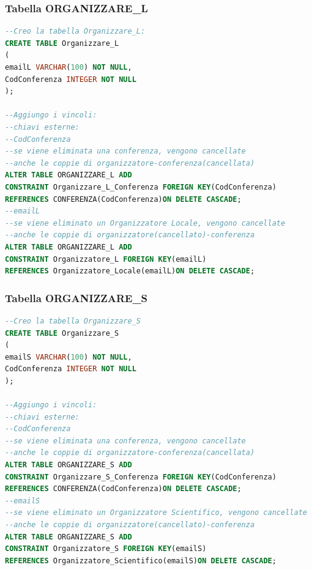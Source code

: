 \documentclass[a4page]{article}
\begin{document}
\subsubsection{Tabella ORGANIZZARE\_L}
\begin{lstlisting}[language=SQL,
        deletekeywords={IDENTITY,INT},
        morekeywords={clustered},    
        framesep=10pt,
        framextopmargin=10pt]
--Creo la tabella Organizzare_L: 
CREATE TABLE Organizzare_L
(
emailL VARCHAR(100) NOT NULL,
CodConferenza INTEGER NOT NULL
);

--Aggiungo i vincoli:
--chiavi esterne:
--CodConferenza
--se viene eliminata una conferenza, vengono cancellate
--anche le coppie di organizzatore-conferenza(cancellata)
ALTER TABLE ORGANIZZARE_L ADD
CONSTRAINT Organizzare_L_Conferenza FOREIGN KEY(CodConferenza)
REFERENCES CONFERENZA(CodConferenza)ON DELETE CASCADE;
--emailL
--se viene eliminato un Organizzatore Locale, vengono cancellate
--anche le coppie di organizzatore(cancellato)-conferenza
ALTER TABLE ORGANIZZARE_L ADD
CONSTRAINT Organizzatore_L FOREIGN KEY(emailL)
REFERENCES Organizzatore_Locale(emailL)ON DELETE CASCADE;        

\end{lstlisting}
\newpage
\subsubsection{Tabella ORGANIZZARE\_S}
\begin{lstlisting}[language=SQL,
        deletekeywords={IDENTITY,INT},
        morekeywords={clustered},    
        framesep=10pt,
        framextopmargin=10pt]
--Creo la tabella Organizzare_S
CREATE TABLE Organizzare_S
(
emailS VARCHAR(100) NOT NULL,
CodConferenza INTEGER NOT NULL
);

--Aggiungo i vincoli:
--chiavi esterne:
--CodConferenza
--se viene eliminata una conferenza, vengono cancellate
--anche le coppie di organizzatore-conferenza(cancellata)
ALTER TABLE ORGANIZZARE_S ADD
CONSTRAINT Organizzare_S_Conferenza FOREIGN KEY(CodConferenza)
REFERENCES CONFERENZA(CodConferenza)ON DELETE CASCADE;
--emailS
--se viene eliminato un Organizzatore Scientifico, vengono cancellate
--anche le coppie di organizzatore(cancellato)-conferenza
ALTER TABLE ORGANIZZARE_S ADD
CONSTRAINT Organizzatore_S FOREIGN KEY(emailS)
REFERENCES Organizzatore_Scientifico(emailS)ON DELETE CASCADE;
        

\end{lstlisting}
\end{document}
